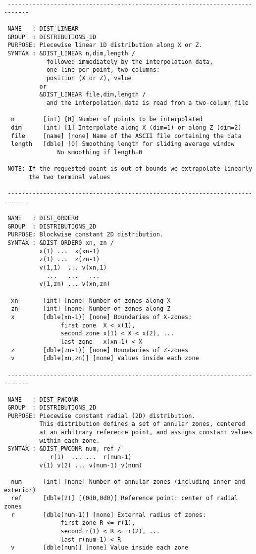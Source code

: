 \begin{verbatim}
 ----------------------------------------------------------------------------

 NAME   : DIST_LINEAR
 GROUP  : DISTRIBUTIONS_1D
 PURPOSE: Piecewise linear 1D distribution along X or Z.
 SYNTAX : &DIST_LINEAR n,dim,length /
            followed immediately by the interpolation data, 
            one line per point, two columns: 
            position (X or Z), value
          or
          &DIST_LINEAR file,dim,length / 
            and the interpolation data is read from a two-column file

  n        [int] [0] Number of points to be interpolated
  dim      [int] [1] Interpolate along X (dim=1) or along Z (dim=2)
  file     [name] [none] Name of the ASCII file containing the data
  length   [dble] [0] Smoothing length for sliding average window
               No smoothing if length=0

 NOTE: If the requested point is out of bounds we extrapolate linearly
       the two terminal values

 ----------------------------------------------------------------------------

 NAME   : DIST_ORDER0
 GROUP  : DISTRIBUTIONS_2D
 PURPOSE: Blockwise constant 2D distribution.
 SYNTAX : &DIST_ORDER0 xn, zn /
          x(1) ...  x(xn-1)
          z(1) ...  z(zn-1)
          v(1,1)  ... v(xn,1)          
            ...   ...   ...
          v(1,zn) ... v(xn,zn)          

  xn       [int] [none] Number of zones along X
  zn       [int] [none] Number of zones along Z
  x        [dble(xn-1)] [none] Boundaries of X-zones: 
                first zone  X < x(1), 
                second zone x(1) < X < x(2), ... 
                last zone   x(xn-1) < X
  z        [dble(zn-1)] [none] Boundaries of Z-zones
  v        [dble(xn,zn)] [none] Values inside each zone

 ----------------------------------------------------------------------------

 NAME   : DIST_PWCONR
 GROUP  : DISTRIBUTIONS_2D
 PURPOSE: Piecewise constant radial (2D) distribution.
          This distribution defines a set of annular zones, centered
          at an arbitrary reference point, and assigns constant values 
          within each zone.
 SYNTAX : &DIST_PWCONR num, ref /
             r(1)  ... ...  r(num-1)
          v(1) v(2) ... v(num-1) v(num)

  num      [int] [none] Number of annular zones (including inner and exterior)
  ref      [dble(2)] [(0d0,0d0)] Reference point: center of radial zones
  r        [dble(num-1)] [none] External radius of zones:
                first zone R <= r(1), 
                second r(1) < R <= r(2), ...
                last r(num-1) < R 
  v        [dble(num)] [none] Value inside each zone


\end{verbatim}
